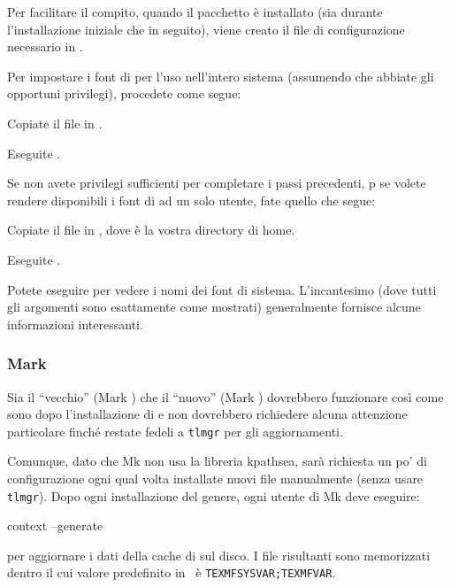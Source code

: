 \documentclass{article}
\begin{document}
Per facilitare il compito, quando il pacchetto  è
installato (sia durante l'installazione iniziale che in seguito), viene 
creato il file di configurazione necessario in
.

Per impostare i font di \TL{} per l'uso nell'intero sistema (assumendo che
abbiate gli opportuni privilegi), procedete come segue:
\begin{enumerate*}
\item Copiate il file  in
  .

\item Eseguite .
\end{enumerate*}

Se non avete privilegi sufficienti per completare i passi precedenti,
p se volete rendere disponibili i font di \TL{} ad un
solo utente, fate quello che segue:
\begin{enumerate*}
\item Copiate il file  in
  , dove \filename{~} è la vostra directory di
  home.

\item Eseguite .
\end{enumerate*}

Potete eseguire  per vedere i nomi dei font di sistema.
L'incantesimo  (dove tutti gli
argomenti sono esattamente come mostrati) generalmente fornisce alcune
informazioni interessanti.


\subsubsection{\ConTeXt{} Mark }
\label{sec:context-mkiv}

Sia il ``vecchio'' \ConTeXt{} (Mark ) che il ``nuovo'' \ConTeXt{}
(Mark ) dovrebbero funzionare così come sono dopo l'installazione
di \TL{} e non dovrebbero richiedere alcuna attenzione particolare finché
restate fedeli a \verb+tlmgr+ per gli aggiornamenti.

Comunque, dato che \ConTeXt{} Mk non usa la libreria kpathsea,
sarà richiesta un po' di configurazione ogni qual volta installate nuovi
file manualmente (senza usare \verb+tlmgr+). Dopo ogni installazione del
genere, ogni utente di Mk deve eseguire:
\begin{sverbatim}
context --generate
\end{sverbatim}
per aggiornare  i dati della cache di \ConTeXt{} sul disco.
I file risultanti sono memorizzati dentro  il cui valore
predefinito in \TL\ è \verb+TEXMFSYSVAR;TEXMFVAR+.
\end{document}
